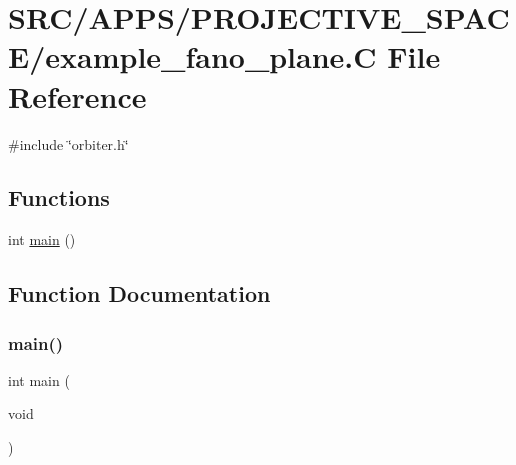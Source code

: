 \hypertarget{example__fano__plane_8_c}{}\section{S\+R\+C/\+A\+P\+P\+S/\+P\+R\+O\+J\+E\+C\+T\+I\+V\+E\+\_\+\+S\+P\+A\+C\+E/example\+\_\+fano\+\_\+plane.C File Reference}
\label{example__fano__plane_8_c}
{\ttfamily \#include \char`\"{}orbiter.\+h\char`\"{}}\newline
\subsection*{Functions}
\begin{DoxyCompactItemize}
\item 
int \mbox{\hyperlink{example__fano__plane_8_c_ae66f6b31b5ad750f1fe042a706a4e3d4}{main}} ()
\end{DoxyCompactItemize}


\subsection{Function Documentation}
\mbox{\label{example__fano__plane_8_c_ae66f6b31b5ad750f1fe042a706a4e3d4}} 
\subsubsection{\texorpdfstring{main()}{main()}}
{\footnotesize\ttfamily int main (\begin{DoxyParamCaption}\item[{void}]{ }\end{DoxyParamCaption})}

